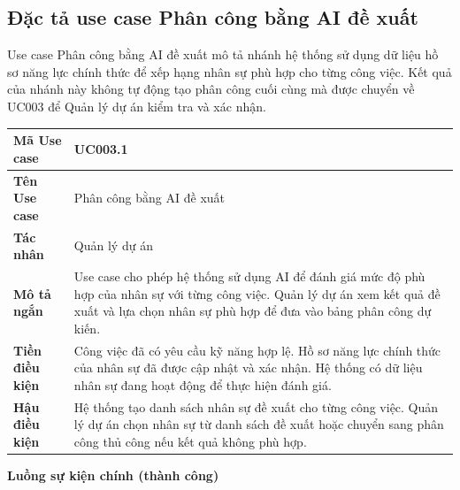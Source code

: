 \documentclass[../DoAn.tex]{subfiles}
\begin{document}
\subsection{Đặc tả use case Phân công bằng AI đề xuất}
\label{subsection:2.3.4}
Use case Phân công bằng AI đề xuất mô tả nhánh hệ thống sử dụng dữ liệu hồ sơ năng lực chính thức để xếp hạng nhân sự phù hợp cho từng công việc. Kết quả của nhánh này không tự động tạo phân công cuối cùng mà được chuyển về UC003 để Quản lý dự án kiểm tra và xác nhận.

{\ucTableText
\begin{longtable}{|>{\columncolor{ucLabelBg}\bfseries}p{}|p{}|}
\hline
Mã Use case & UC003.1 \\ \hline
Tên Use case & Phân công bằng AI đề xuất \\ \hline
Tác nhân & Quản lý dự án \\ \hline
Mô tả ngắn & Use case cho phép hệ thống sử dụng AI để đánh giá mức độ phù hợp của nhân sự với từng công việc. Quản lý dự án xem kết quả đề xuất và lựa chọn nhân sự phù hợp để đưa vào bảng phân công dự kiến. \\ \hline
Tiền điều kiện & Công việc đã có yêu cầu kỹ năng hợp lệ. Hồ sơ năng lực chính thức của nhân sự đã được cập nhật và xác nhận. Hệ thống có dữ liệu nhân sự đang hoạt động để thực hiện đánh giá. \\ \hline
Hậu điều kiện & Hệ thống tạo danh sách nhân sự đề xuất cho từng công việc. Quản lý dự án chọn nhân sự từ danh sách đề xuất hoặc chuyển sang phân công thủ công nếu kết quả không phù hợp. \\ \hline
\end{longtable}
}

\textbf{Luồng sự kiện chính (thành công)}
\end{document}
